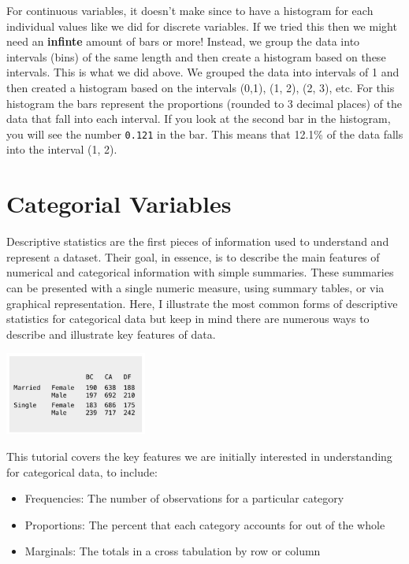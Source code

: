 \documentclass[
  letterpaper,
  DIV=11,
  numbers=noendperiod]{scrreprt}
\providecommand{\tightlist}{%
  \setlength{\itemsep}{0pt}\setlength{\parskip}{0pt}}\usepackage{longtable,booktabs,array}
\begin{document}
For continuous variables, it doesn't make since to have a histogram for
each individual values like we did for discrete variables. If we tried
this then we might need an \textbf{infinte} amount of bars or more!
Instead, we group the data into intervals (bins) of the same length and
then create a histogram based on these intervals. This is what we did
above. We grouped the data into intervals of 1 and then created a
histogram based on the intervals (0,1), (1, 2), (2, 3), etc. For this
histogram the bars represent the proportions (rounded to 3 decimal
places) of the data that fall into each interval. If you look at the
second bar in the histogram, you will see the number \texttt{0.121} in
the bar. This means that 12.1\% of the data falls into the interval (1,
2).


\chapter*{Categorial Variables}\label{categorial-variables}


Descriptive statistics are the first pieces of information used to
understand and represent a dataset. Their goal, in essence, is to
describe the main features of numerical and categorical information with
simple summaries. These summaries can be presented with a single numeric
measure, using summary tables, or via graphical representation. Here, I
illustrate the most common forms of descriptive statistics for
categorical data but keep in mind there are numerous ways to describe
and illustrate key features of data.

\includegraphics[width=0.35\textwidth,height=\textheight]{./images/Daily-6-Pic-1.jpg}

This tutorial covers the key features we are initially interested in
understanding for categorical data, to include:

\begin{itemize}
\tightlist
\item
  Frequencies: The number of observations for a particular category
\item
  Proportions: The percent that each category accounts for out of the
  whole
\item
  Marginals: The totals in a cross tabulation by row or column
\end{itemize}
\end{document}
